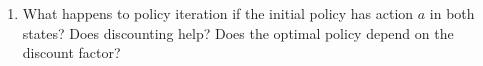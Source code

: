 \documentclass[11pt, a4paper]{article}
\begin{document}
\begin{enumerate}

    \item What happens to policy iteration if the initial policy has action $a$ in both states? Does discounting help? Does the optimal policy depend on the discount factor?
    

\end{enumerate}
\end{document}

